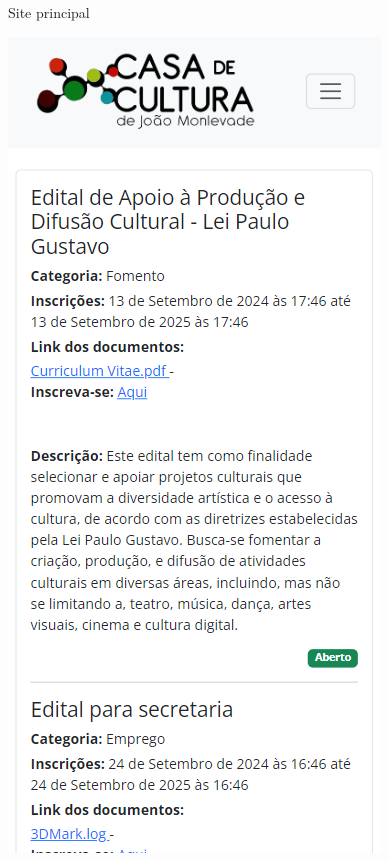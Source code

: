 \begin{frame}{Site principal}
\begin{center}
            \includegraphics[height=\textheight]{beamerthemesrc/assets/responsividade4.png}
        \end{center}
    \end{frame}
